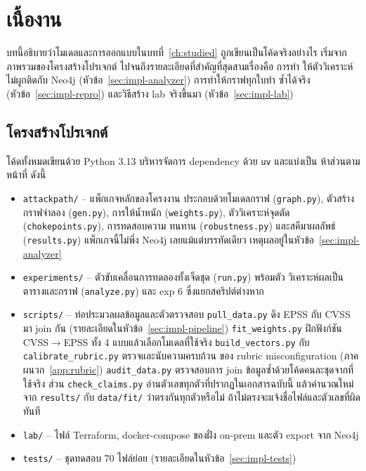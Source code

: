 \chapter{เนื้องาน}\label{ch:impl}

บทนี้อธิบายว่าโมเดลและการออกแบบในบทที่~\ref{ch:studied} ถูกเขียนเป็นโค้ดจริงอย่างไร
เริ่มจากภาพรวมของโครงสร้างโปรเจกต์ ไปจนถึงรายละเอียดที่สำคัญที่สุดสามเรื่องคือ การทำ
ให้ตัววิเคราะห์ไม่ผูกติดกับ Neo4j (หัวข้อ~\ref{sec:impl-analyzer}) การทำให้กราฟทุกใบทำ
ซ้ำได้จริง (หัวข้อ~\ref{sec:impl-repro}) และวิธีสร้าง lab จริงขึ้นมา (หัวข้อ~\ref{sec:impl-lab})

\section{โครงสร้างโปรเจกต์}\label{sec:impl-structure}

โค้ดทั้งหมดเขียนด้วย Python 3.13 บริหารจัดการ dependency ด้วย \texttt{uv} และแบ่งเป็น
ห้าส่วนตามหน้าที่ ดังนี้

\begin{itemize}[leftmargin=1.6em]
\item \texttt{attackpath/} -- แพ็กเกจหลักของโครงงาน ประกอบด้วยโมเดลกราฟ
(\texttt{graph.py}), ตัวสร้างกราฟจำลอง (\texttt{gen.py}), การให้น้ำหนัก
(\texttt{weights.py}), ตัววิเคราะห์จุดตัด (\texttt{chokepoints.py}), การทดสอบความ
ทนทาน (\texttt{robustness.py}) และสคีมาผลลัพธ์ (\texttt{results.py}) แพ็กเกจนี้ไม่พึ่ง
Neo4j เลยแม้แต่บรรทัดเดียว เหตุผลอยู่ในหัวข้อ~\ref{sec:impl-analyzer}
\item \texttt{experiments/} -- ตัวขับเคลื่อนการทดลองทั้งเจ็ดชุด (\texttt{run.py}) พร้อมตัว
วิเคราะห์ผลเป็นตารางและกราฟ (\texttt{analyze.py}) และ exp 6 ซึ่งแยกสคริปต์ต่างหาก
\item \texttt{scripts/} -- ท่อประมวลผลข้อมูลและตัวตรวจสอบ \texttt{pull\_data.py}
ดึง EPSS กับ CVSS มา join กัน (รายละเอียดในหัวข้อ~\ref{sec:impl-pipeline})
\texttt{fit\_weights.py} ฝึกฟังก์ชัน CVSS$\to$EPSS ทั้ง 4 แบบแล้วเลือกโมเดลที่ใช้จริง
\texttt{build\_vectors.py} กับ \texttt{calibrate\_rubric.py} ตรวจและนับความครบถ้วน
ของ rubric misconfiguration (ภาคผนวก~\ref{app:rubric}) \texttt{audit\_data.py}
ตรวจสอบการ join ข้อมูลซ้ำด้วยโค้ดคนละชุดจากที่ใช้จริง ส่วน \texttt{check\_claims.py}
อ่านตัวเลขทุกตัวที่ปรากฏในเอกสารฉบับนี้ แล้วคำนวณใหม่จาก \texttt{results/} กับ
\texttt{data/fit/} ว่าตรงกันทุกตัวหรือไม่ ถ้าไม่ตรงจะแจ้งชื่อไฟล์และตัวเลขที่ผิดทันที
\item \texttt{lab/} -- ไฟล์ Terraform, docker-compose ของฝั่ง on-prem และตัว export
จาก Neo4j
\item \texttt{tests/} -- ชุดทดสอบ 70 ไฟล์ย่อย (รายละเอียดในหัวข้อ~\ref{sec:impl-tests})
\end{itemize}


